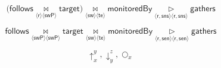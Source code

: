 \documentclass[a4paper,10pt]{article}
\newcommand{\tuple}[1]{\langle #1 \rangle}
\newcommand{\joinsymbol}{\bowtie}
\newcommand{\antijoinsymbol}{\, \triangleright \,}
\newcommand{\join}[2]{\!\underset{\tuple{\mathsf{#1}} \tuple{\mathsf{#2}}}{\joinsymbol}\!}
\newcommand{\antijoin}[2]{\!\underset{\tuple{\mathsf{#1}} \tuple{\mathsf{#2}}}{\antijoinsymbol}\!}
\newcommand{\expandout}[2]{\uparrow_{#1}^{#2}}
\newcommand{\expandin}[2]{\downarrow_{#1}^{#2}}
\newcommand{\getnodes}[1]{\bigcirc_{#1}}
\newcommand{\relation}[1]{\mathsf{#1}}
\begin{document}

$$\Big(\relation{follows} \join{r}{swP} \relation{target}\Big) \join{sw}{te} \relation{monitoredBy} \antijoin{\relation{r,sns}}{\relation{r,sns}} \relation{gathers}$$

$$\relation{follows} \join{swP}{swP} \relation{target} \join{sw}{te} \relation{monitoredBy} \antijoin{r,sen}{r,sen} \relation{gathers}$$

$$\expandout{x}{y}, \expandin{y}{z}, \getnodes{x}$$
\end{document}
